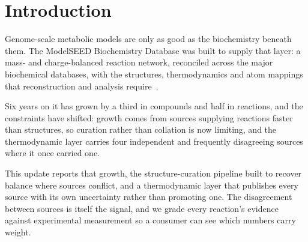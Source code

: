 \section{Introduction}

Genome-scale metabolic models are only as good as the biochemistry beneath
them. The ModelSEED Biochemistry Database was built to supply that layer:
a mass- and charge-balanced reaction network, reconciled across the major
biochemical databases, with the structures, thermodynamics and atom mappings
that reconstruction and analysis require~\cite{seaver2020}.

Six years on it has grown by a third in compounds and half in reactions, and
the constraints have shifted: growth comes from sources supplying reactions
faster than structures, so curation rather than collation is now limiting, and
the thermodynamic layer carries four independent and frequently disagreeing
sources where it once carried one.

This update reports that growth, the structure-curation pipeline built to
recover balance where sources conflict, and a thermodynamic layer that publishes
every source with its own uncertainty rather than promoting one. The
disagreement between sources is itself the signal, and we grade every reaction's
evidence against experimental measurement so a consumer can see which numbers
carry weight.
